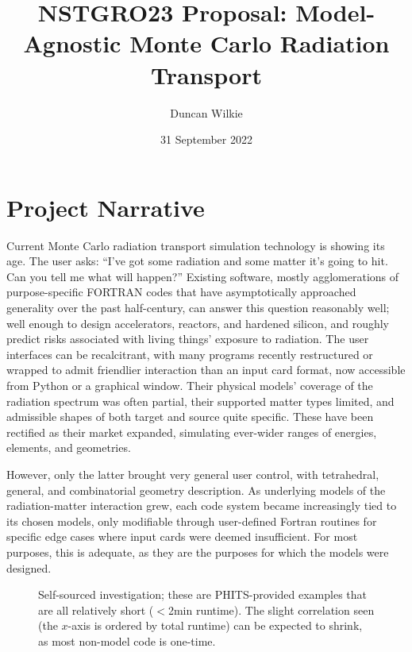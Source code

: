 \documentclass{article}
\title{NSTGRO23 Proposal: Model-Agnostic Monte Carlo Radiation Transport}
\author{Duncan Wilkie}
\date{31 September 2022}
\begin{document}
\maketitle

\section{Project Narrative}
\label{sec:project-narrative}

Current Monte Carlo radiation transport simulation technology is showing its age.
 The user asks: ``I've got some radiation and some matter it's going to hit. Can you tell me what will happen?'' %
Existing software, mostly agglomerations of purpose-specific FORTRAN codes that have asymptotically approached generality over the past half-century,
can answer this question reasonably well; well enough to design accelerators, reactors, and hardened silicon,
and roughly predict risks associated with living things' exposure to radiation.
The user interfaces can be recalcitrant, with many programs recently restructured or wrapped to admit friendlier interaction than an input card format,
now accessible from Python or a graphical window.
Their physical models' coverage of the radiation spectrum was often partial, their supported matter types limited,
and admissible shapes of both target and source quite specific.
These have been rectified as their market expanded, simulating ever-wider ranges of energies, elements, and geometries.

However, only the latter brought very general user control, with tetrahedral, general, and combinatorial geometry description.
As underlying models of the radiation-matter interaction grew, each code system became increasingly tied to its chosen models,
only modifiable through user-defined Fortran routines for specific edge cases where input cards were deemed insufficient.
For most purposes, this is adequate, as they are the purposes for which the models were designed.

\begin{wrapfigure}{R}{0.5\textwidth}
  \centering
  \label{fig:mcruntime}
  \scalebox{0.8}{}
  \caption{Self-sourced investigation; these are PHITS-provided examples that are all relatively short ($<$2min runtime).
  The slight correlation seen (the $x$-axis is ordered by total runtime) can be expected to shrink, as most non-model code is one-time.}
\end{wrapfigure}
\end{document}
